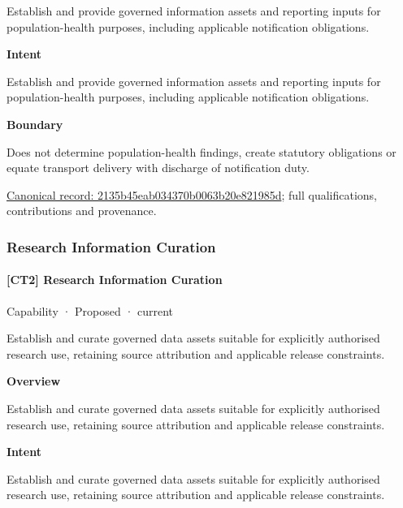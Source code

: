 Establish and provide governed information assets and reporting inputs for population-health purposes, including applicable notification obligations.



\textbf{Intent}



Establish and provide governed information assets and reporting inputs for population-health purposes, including applicable notification obligations.



\textbf{Boundary}



Does not determine population-health findings, create statutory obligations or equate transport delivery with discharge of notification duty.


{\footnotesize \href{../../../../continuum/strategy/capability/2135b45eab034370b0063b20e821985d.md}{Canonical record: 2135b45eab034370b0063b20e821985d}; full qualifications, contributions and provenance.}\par
\subsubsection{Research Information Curation}

\paragraph{[CT2] Research Information Curation}

\label{element:4f5b8cec90324c2989cdc30e80bc8cb9}
{\small Capability · Proposed · current}\par

Establish and curate governed data assets suitable for explicitly authorised research use, retaining source attribution and applicable release constraints.



\textbf{Overview}



Establish and curate governed data assets suitable for explicitly authorised research use, retaining source attribution and applicable release constraints.



\textbf{Intent}



Establish and curate governed data assets suitable for explicitly authorised research use, retaining source attribution and applicable release constraints.



